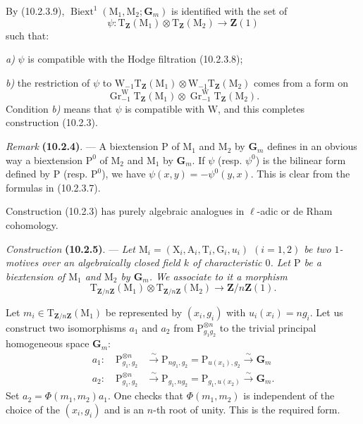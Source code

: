 \documentclass[11pt,leqno]{article}
\newcommand{\Page}[1]{\ifvmode\noindent\else\unskip\ \fi{\footnotesize\textcolor{gray}{[p.\,#1]}}\ \ignorespaces}
\begin{document}
By (10.2.3.9),
\(\operatorname{Biext}^{1}(\mathrm{M}_1,\mathrm{M}_2;\mathbf{G}_m)\)
is identified with the set of
\[
\psi:\mathrm{T}_{\mathbf{Z}}(\mathrm{M}_1)\otimes
\mathrm{T}_{\mathbf{Z}}(\mathrm{M}_2)\to\mathbf{Z}(1)
\]
such that:

\noindent\textit{a)} \(\psi\) is compatible with the Hodge
filtration (10.2.3.8);

\noindent\textit{b)} the restriction of \(\psi\) to
\(\mathrm{W}_{-1}\mathrm{T}_{\mathbf{Z}}(\mathrm{M}_1)\otimes
\mathrm{W}_{-1}\mathrm{T}_{\mathbf{Z}}(\mathrm{M}_2)\)
comes from a form on
\[
\operatorname{Gr}^{\mathrm{W}}_{-1}
\mathrm{T}_{\mathbf{Z}}(\mathrm{M}_1)\otimes
\operatorname{Gr}^{\mathrm{W}}_{-1}
\mathrm{T}_{\mathbf{Z}}(\mathrm{M}_2).
\]
Condition \textit{b)} means that \(\psi\) is compatible with
\(\mathrm{W}\), and this completes construction (10.2.3).

\textit{Remark} \textbf{(10.2.4)}. — A biextension
\(\mathrm{P}\) of \(\mathrm{M}_1\) and \(\mathrm{M}_2\) by
\(\mathbf{G}_m\) defines in an obvious way a biextension
\(\mathrm{P}^{0}\) of \(\mathrm{M}_2\) and \(\mathrm{M}_1\) by
\(\mathbf{G}_m\). If \(\psi\) (resp. \(\psi^{0}\)) is the bilinear
form
\Page{64}
defined by \(\mathrm{P}\) (resp. \(\mathrm{P}^{0}\)), we have
\(\psi(x,y)=-\psi^{0}(y,x)\). This is clear from the formulas in
(10.2.3.7).

Construction (10.2.3) has purely algebraic analogues in
\(\ell\)-adic or de Rham cohomology.

\textit{Construction} \textbf{(10.2.5)}. — \textit{Let
\(\mathrm{M}_i=(\mathrm{X}_i,\mathrm{A}_i,\mathrm{T}_i,\mathrm{G}_i,u_i)\)
\((i=1,2)\) be two \(1\)-motives over an algebraically closed
field \(k\) of characteristic \(0\). Let \(\mathrm{P}\) be a biextension
of \(\mathrm{M}_1\) and \(\mathrm{M}_2\) by \(\mathbf{G}_m\).
We associate to it a morphism}
\[
\mathrm{T}_{\mathbf{Z}/n\mathbf{Z}}(\mathrm{M}_1)\otimes
\mathrm{T}_{\mathbf{Z}/n\mathbf{Z}}(\mathrm{M}_2)
\to\mathbf{Z}/n\mathbf{Z}(1).
\]

Let \(m_i\in\mathrm{T}_{\mathbf{Z}/n\mathbf{Z}}(\mathrm{M}_1)\)
be represented by \((x_i,g_i)\) with \(u_i(x_i)=ng_i\).
Let us construct two isomorphisms \(a_1\) and \(a_2\) from
\(\mathrm{P}_{g_1g_2}^{\otimes n}\) to the trivial principal homogeneous space
\(\mathbf{G}_m\):
\[
\begin{aligned}
a_1:\quad
\mathrm{P}_{g_1,g_2}^{\otimes n}
&\xrightarrow{\sim}\mathrm{P}_{ng_1,g_2}
=\mathrm{P}_{u(x_1),g_2}\xrightarrow{\sim}\mathbf{G}_m\\
a_2:\quad
\mathrm{P}_{g_1,g_2}^{\otimes n}
&\xrightarrow{\sim}\mathrm{P}_{g_1,ng_2}
=\mathrm{P}_{g_1,u(x_2)}\xrightarrow{\sim}\mathbf{G}_m.
\end{aligned}
\]
Set \(a_2=\Phi(m_1,m_2)a_1\). One checks that
\(\Phi(m_1,m_2)\) is independent of the choice of the \((x_i,g_i)\) and
is an \(n\)-th root of unity. This is the required form.
\end{document}
